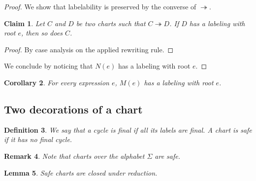 \documentclass{article}
\newtheorem{definition}{Definition}[section]
\newtheorem{lemma}[definition]{Lemma}
\newtheorem{claim}[definition]{Claim}
\newtheorem{corollary}[definition]{Corollary}
\newtheorem{remark}[definition]{Remark}
\begin{document}
\begin{proof} We show that labelability is preserved by the converse of $\twoheadrightarrow$.
 
     \begin{claim}
     Let $C$ and $D$ be two charts such that $C \twoheadrightarrow D$. If $D$ has a
      labeling with root $e$,  then so does $C$.  
      \end{claim}
      \begin{proof}
        By case analysis on the applied rewriting rule.
      \end{proof}

      We conclude by noticing that $N(e)$ has a labeling with root $e$.
    \end{proof}

\begin{corollary} For every expression $e$, $M(e)$ has a labeling with root $e$.~\label{prop:milner-chart-is-decorable}
~\label{prop:Milner-is-decorable}\end{corollary}

     \subsection{Two decorations of a chart}

  \begin{definition}
 We say that a cycle is \emph{final} if all its labels are final. A chart is \emph{safe} if it has no final cycle.
 \end{definition}

 \begin{remark} Note that charts over the alphabet $\Sigma$ are safe.
 \end{remark}
 \begin{lemma} Safe charts are closed under reduction.\end{lemma}
\end{document}
